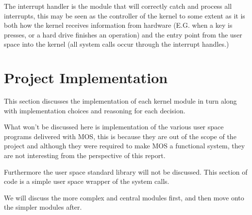 \documentclass[a4paper]{report}
\begin{document}
The interrupt handler is the module that will correctly catch and process all interrupts, this may be seen as the controller of the kernel to some extent as it is both how the kernel receives information from hardware (E.G. when a key is presses, or a hard drive finishes an operation) and the entry point from the user space into the kernel (all system calls occur through the interrupt handles.)












































\chapter{Project Implementation}

This section discusses the implementation of each kernel module in turn along with implementation choices and reasoning for each decision.

What won't be discussed here is implementation of the various user space programs delivered with MOS, this is because they are out of the scope of the project and although they were required to make MOS a functional system, they are not interesting from the perspective of this report.

Furthermore the user space standard library will not be discussed. This section of code is a simple user space wrapper of the system calls.

We will discuss the more complex and central modules first, and then move onto the simpler modules after.
\end{document}
